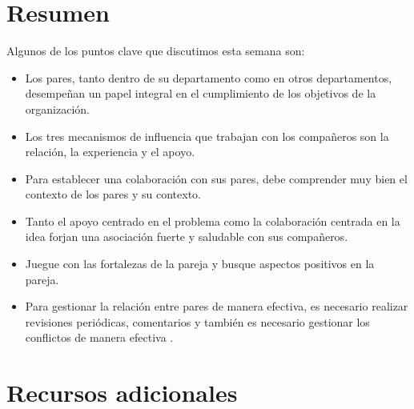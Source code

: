 \documentclass[10pt]{book}
\begin{document}
\section{Resumen}
Algunos de los puntos clave que discutimos esta semana son:
\begin{itemize}
\item Los pares, tanto dentro de su departamento como en otros departamentos, desempeñan un papel integral  en el cumplimiento de los objetivos de la organización.
\item Los tres mecanismos de influencia que trabajan con los compañeros son la relación, la experiencia y el apoyo.
\item Para establecer una colaboración con sus pares, debe comprender muy bien el contexto de los pares y su contexto.
\item Tanto el apoyo centrado en el problema como la colaboración centrada en la idea forjan una asociación fuerte y saludable con sus compañeros.
\item Juegue con las fortalezas de la pareja y busque aspectos positivos en la pareja.
\item Para gestionar la relación entre pares de manera efectiva, es necesario realizar revisiones periódicas, comentarios y también es necesario gestionar los conflictos de manera efectiva .
\end{itemize}
\section{Recursos adicionales}
\end{document}
